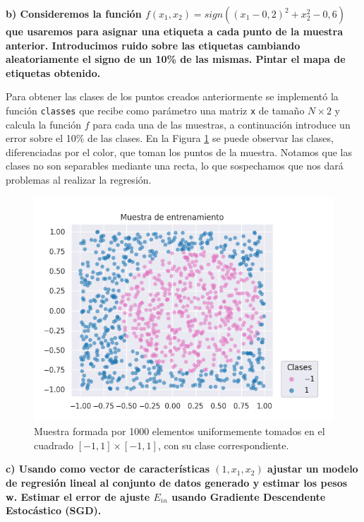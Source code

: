 \documentclass[a4paper, 20pt]{article}
\begin{document}
\textbf{b) Consideremos la función $f(x_1, x_2) = sign((x_1 - 0,2)^2 + x_2^2 - 0,6)$ que usaremos para asignar una etiqueta a cada punto de la muestra anterior. Introducimos ruido sobre las etiquetas cambiando aleatoriamente el signo de un 10\% de las mismas. Pintar el mapa de etiquetas obtenido.}

Para obtener las clases de los puntos creados anteriormente se implementó la función \texttt{classes} que recibe como parámetro una matriz \texttt{x} de tamaño $N\times 2$ y calcula la función $f$ para cada una de las muestras, a continuación introduce un error sobre el 10\% de las clases. En la Figura \ref{fig:22b} se puede observar las clases, diferenciadas por el color, que toman los puntos de la muestra. Notamos que las clases no son separables mediante una recta, lo que sospechamos que nos dará problemas al realizar la regresión.

\begin{figure}[H]
    \centering
    \includegraphics[width=1\textwidth]{clases2d}
    \caption{Muestra formada por 1000 elementos uniformemente tomados en el cuadrado $[-1,1]\times[-1,1]$, con su clase correspondiente.}
    \label{fig:22b}
\end{figure}

\textbf{c) Usando como vector de características $(1, x_1 , x_2)$ ajustar un modelo de regresión lineal al conjunto de datos generado y estimar los pesos w. Estimar el error de ajuste $E_{in}$ usando Gradiente Descendente Estocástico (SGD).}
\end{document}
